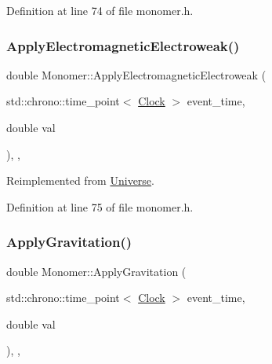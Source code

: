 Definition at line 74 of file monomer.\+h.

\mbox{\label{class_monomer_a4c3f9894ea57047789bec32602f033cb}} 
\subsubsection{\texorpdfstring{Apply\+Electromagnetic\+Electroweak()}{ApplyElectromagneticElectroweak()}}
{\footnotesize\ttfamily double Monomer\+::\+Apply\+Electromagnetic\+Electroweak (\begin{DoxyParamCaption}\item[{std\+::chrono\+::time\+\_\+point$<$ \mbox{\hyperlink{universe_8h_a0ef8d951d1ca5ab3cfaf7ab4c7a6fd80}{Clock}} $>$}]{event\+\_\+time,  }\item[{double}]{val }\end{DoxyParamCaption})\hspace{0.3cm}{\ttfamily [inline]}, {\ttfamily [final]}, {\ttfamily [virtual]}}



Reimplemented from \mbox{\hyperlink{class_universe_a4c36c1ab30db993307f88363dde5e8c5}{Universe}}.



Definition at line 75 of file monomer.\+h.

\mbox{\label{class_monomer_a8747945cc2f7abd7ce0885345ad14ebc}} 
\subsubsection{\texorpdfstring{Apply\+Gravitation()}{ApplyGravitation()}}
{\footnotesize\ttfamily double Monomer\+::\+Apply\+Gravitation (\begin{DoxyParamCaption}\item[{std\+::chrono\+::time\+\_\+point$<$ \mbox{\hyperlink{universe_8h_a0ef8d951d1ca5ab3cfaf7ab4c7a6fd80}{Clock}} $>$}]{event\+\_\+time,  }\item[{double}]{val }\end{DoxyParamCaption})\hspace{0.3cm}{\ttfamily [inline]}, {\ttfamily [final]}, {\ttfamily [virtual]}}



